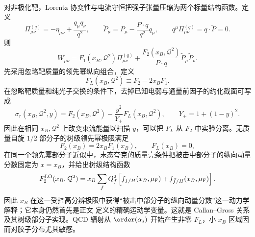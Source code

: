 对非极化靶，Lorentz 协变性与电流守恒把强子张量压缩为两个标量结构函数。定义
\begin{equation}
 {
 \Pi_{\mu\nu}^{(q)}=-\eta_{\mu\nu}+\frac{q_\mu q_\nu}{q^2},
 \qquad
 \widetilde P_\mu=P_\mu-\frac{P\cdot q}{q^2}q_\mu,}
 \qquad
 q^\mu\Pi_{\mu\nu}^{(q)}=q\cdot\widetilde P=0.
 \label{eq:dis-transverse-tensor-basis-dp68}
\end{equation}
则
\begin{equation}
 {
 W_{\mu\nu}
 =F_1(x_B,\mathcal Q^2)\Pi_{\mu\nu}^{(q)}
 +\frac{F_2(x_B,\mathcal Q^2)}{P\cdot q}
 \widetilde P_\mu\widetilde P_\nu.}
 \label{eq:dis-W-decomposition-dp13}
\end{equation}
先采用忽略靶质量的领先幂纵向组合，定义
\begin{equation}
 {F_L(x_B,\mathcal Q^2)\equiv F_2-2x_BF_1.}
 \label{eq:dis-longitudinal-structure-function-dp31}
\end{equation}
在忽略靶质量和纯光子交换的条件下，去掉已知电弱与通量前因子的约化截面可写成
\begin{equation}
 {
 \sigma_r(x_B,\mathcal Q^2,y)
 =F_2(x_B,\mathcal Q^2)
 -\frac{y^2}{Y_+}F_L(x_B,\mathcal Q^2),
 \qquad
 Y_+=1+(1-y)^2.}
 \label{eq:dis-reduced-cross-section-dp31}
\end{equation}
因此在相同 $x_B,\mathcal Q^2$ 上改变束流能量以扫描 $y$，可以把 $F_L$ 从 $F_2$ 中实验分离。无质量自旋 $1/2$ 部分子的树级领先幂极限满足
\begin{equation}
 {F_2(x_B)=2x_BF_1(x_B),\qquad F_L(x_B)=0,}
 \label{eq:dis-callan-gross-dp68}
\end{equation}
在同一个领先幂部分子近似中，末态夸克的质量壳条件把被击中部分子的纵向动量分数固定为 $x=x_B$，并给出树级结构函数
\begin{equation}
 {
 F_2^{\rm LO}(x_B,\mathcal Q^2)
 =x_B\sum_fQ_f^2\left[
 f_{f/H}(x_B,\mu_{\rm F})+f_{\bar f/H}(x_B,\mu_{\rm F})
 \right].}
 \label{eq:dis-tree-parton-f2-dp76}
\end{equation}
因此 $x_B$ 在这一受控高分辨极限中获得“被击中部分子的纵向动量分数”这一动力学解释；它本身仍然首先是正文 定义的精确运动学变量。这就是 Callan--Gross 关系及其树级部分子实现。QCD 辐射从 $\order(\alpha_s)$ 开始产生非零 $F_L$，小 $x_B$ 区域因而对胶子分布尤其敏感。

